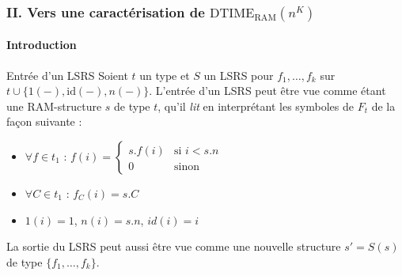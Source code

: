 \documentclass[10pt]{beamer}
\newcommand{\dtimeram}{\text{DTIME}_{\text{RAM}}\left( n^K \right)}
\begin{document}
	
	
	
	\begin{frame}
		\frametitle{II. Vers une caractérisation de $\dtimeram$}
		\framesubtitle{Introduction}
		
		\begin{block}{Entrée d'un LSRS}	
			Soient $t$ un type et $S$ un LSRS pour $f_1, \dots, f_k$ sur $t \cup \{1(-), \text{id}(-), n(-) \}$. 
			L'entrée d'un LSRS peut être vue comme étant une RAM-structure $s$ de type $t$, qu'il \emph{lit} en interprétant les symboles de $F_t$ de la façon suivante : 
			
			\begin{itemize}[itemsep=-1mm]
				\item 	$\forall f \in t_1$ :   $f(i) = 
				\left\lbrace \begin{array}{ll}
				s.f(i) & \text{si } i< s.n \\
				0 & \text{sinon}
				\end{array}\right.$
				
				\item 	$\forall C \in t_1$ :   $f_C(i) = s.C$
				\item 	$1(i) = 1$, $n(i) = s.n$, $id(i) = i$
			\end{itemize}
			
			La sortie du LSRS peut aussi être vue comme une nouvelle structure $s' = S(s)$ de type $\{f_1, \dots, f_k\}$.
		\end{block}
	\end{frame}
	
	
\end{document}
